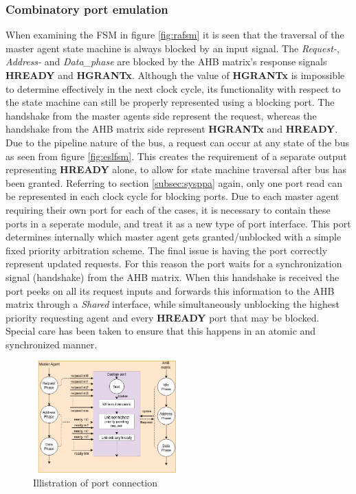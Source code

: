 \subsubsection{Combinatory port emulation}
When examining the FSM in figure \ref{fig:rafsm} it is seen that the traversal of the master agent state machine is always blocked by an input signal. The \textit{Request-}, \textit{Address-} and \textit{Data\_phase} are blocked by the AHB matrix's response signals \textbf{HREADY} and \textbf{HGRANTx}. Although the value of \textbf{HGRANTx} is impossible to determine effectively in the next clock cycle, its functionality with respect to the state machine can still be properly represented using a blocking port. The handshake from the master agents side represent the request, whereas the handshake from the AHB matrix side represent \textbf{HGRANTx} and \textbf{HREADY}. Due to the pipeline nature of the bus, a request can occur at any state of the bus as seen from figure \ref{fig:eslfsm}. This creates the requirement of a separate output representing \textbf{HREADY} alone, to allow for state machine traversal after bus has been granted. Referring to section \ref{subsec:sysppa} again, only one port read can be represented in each clock cycle for blocking ports. Due to each master agent requiring their own port for each of the cases, it is necessary to contain these ports in a seperate module, and treat it as a new type of port interface.
This port determines internally which master agent gets granted/unblocked with a simple fixed priority arbitration scheme. The final issue is having the port correctly represent updated requests. For this reason the port waits for a synchronization signal (handshake) from the AHB matrix. When this handshake is received the port peeks on all its request inputs and forwards this information to the AHB matrix through a \textit{Shared} interface, while simultaneously unblocking the highest priority requesting agent and every \textbf{HREADY} port that may be blocked. Special care has been taken to ensure that this happens in an atomic and synchronized manner. 
\newpage   
\begin{figure}
\includegraphics[width=5.5cm]{figs/ESL/port_diagram.png}
\caption{Illistration of port connection}\label{fig:cport}
\end{figure}

